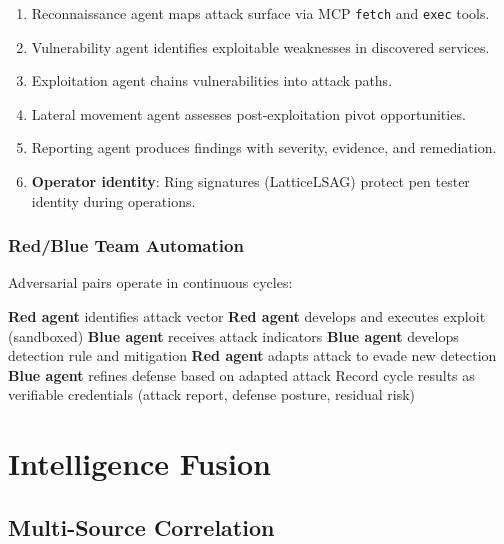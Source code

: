 \documentclass[11pt,letterpaper]{article}
\begin{document}
\begin{enumerate}
\item Reconnaissance agent maps attack surface via MCP \texttt{fetch} and \texttt{exec} tools.
\item Vulnerability agent identifies exploitable weaknesses in discovered services.
\item Exploitation agent chains vulnerabilities into attack paths.
\item Lateral movement agent assesses post-exploitation pivot opportunities.
\item Reporting agent produces findings with severity, evidence, and remediation.
\item \textbf{Operator identity}: Ring signatures (LatticeLSAG) protect pen tester identity during operations.
\end{enumerate}

\subsubsection{Red/Blue Team Automation}

Adversarial pairs operate in continuous cycles:

\begin{algorithm}[H]
\caption{Red/Blue Agent Cycle}
\begin{algorithmic}[1]
\Repeat
  \State \textbf{Red agent} identifies attack vector
  \State \textbf{Red agent} develops and executes exploit (sandboxed)
  \State \textbf{Blue agent} receives attack indicators
  \State \textbf{Blue agent} develops detection rule and mitigation
  \State \textbf{Red agent} adapts attack to evade new detection
  \State \textbf{Blue agent} refines defense based on adapted attack
  \State Record cycle results as verifiable credentials
\State \Return (attack report, defense posture, residual risk)
\end{algorithmic}
\end{algorithm}

\section{Intelligence Fusion}

\subsection{Multi-Source Correlation}
\end{document}
